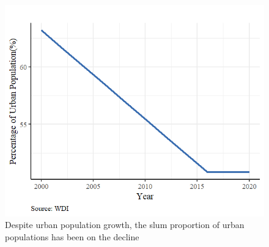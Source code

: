 \begin{figure}
    \centering
    \includegraphics[scale = 0.8]{Graphics/Kenyan Urban Slums.png}
    \caption{Despite urban population growth, the slum proportion of urban populations has been on the decline}
    \label{fig:kenyanslums}
\end{figure}



